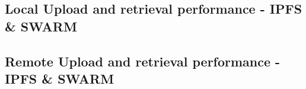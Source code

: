 \subsection{Local Upload and retrieval performance - IPFS \& SWARM}\label{subsection:}
\subsection{Remote Upload and retrieval performance - IPFS \& SWARM}\label{subsection:}

